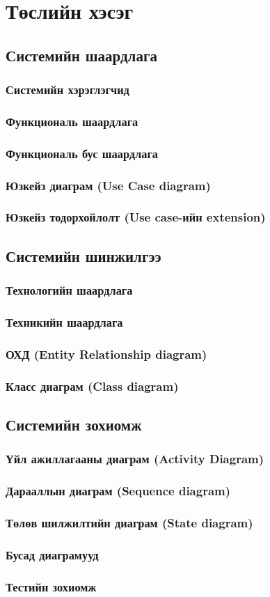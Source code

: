 \chapter{Төслийн хэсэг}
\section{Системийн шаардлага}
\subsection{Системийн хэрэглэгчид}
\subsection{Функциональ шаардлага}
\subsection{Функциональ бус шаардлага}
\subsection{Юзкейз диаграм (Use Case diagram)}
\subsection{Юзкейз тодорхойлолт (Use case-ийн extension)}
\section{Системийн шинжилгээ}
\subsection{Технологийн шаардлага}
\subsection{Техникийн шаардлага}
\subsection{ОХД (Entity Relationship diagram)}
\subsection{Класс диаграм (Class diagram)}
\section{Системийн зохиомж}
\subsection{Үйл ажиллагааны диаграм (Activity Diagram)}
\subsection{Дарааллын диаграм (Sequence diagram)}
\subsection{Төлөв шилжилтийн диаграм (State diagram)}
\subsection{Бусад диаграмууд}
\subsection{Тестийн зохиомж}